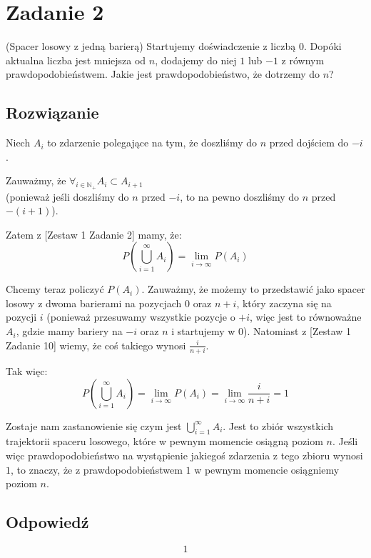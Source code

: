 \section{Zadanie 2}
(Spacer losowy z jedną barierą)
Startujemy doświadczenie z liczbą \(0\). Dopóki aktualna liczba jest mniejsza od \(n\),
dodajemy do niej \(1\) lub \(-1\) z równym prawdopodobieństwem.
Jakie jest prawdopodobieństwo, że dotrzemy do \(n\)?

\subsection*{Rozwiązanie}
Niech \(A_i\) to zdarzenie polegające na tym,
że doszliśmy do \(n\) przed dojściem do \(-i\).

Zauważmy, że \(\forall _{i\in\mathbb{N_+}} A_i \subset A_{i+1}\) \\
(ponieważ jeśli doszliśmy do \(n\) przed \(-i\), to na pewno doszliśmy do \(n\) przed \(-(i+1)\)).

Zatem z [Zestaw 1 Zadanie 2] mamy, że:
\[
	P\left(\bigcup_{i=1}^{\infty} A_i\right) = \lim_{i\to\infty} P(A_i)
\]

Chcemy teraz policzyć \(P(A_i)\).
Zauważmy, że możemy to przedstawić jako spacer losowy z dwoma barierami na pozycjach
\(0\) oraz \(n + i\), który zaczyna się na pozycji \(i\)
(ponieważ przesuwamy wszystkie pozycje o \(+i\), więc jest to równoważne \(A_i\),
gdzie mamy bariery na \(-i\) oraz \(n\) i startujemy w \(0\)).
Natomiast z [Zestaw 1 Zadanie 10] wiemy, że coś takiego wynosi \(\frac{i}{n+i}\).

Tak więc:
\[
	P\left(\bigcup_{i=1}^{\infty} A_i\right) = \lim_{i\to\infty} P(A_i) = \lim_{i\to\infty} \frac{i}{n+i} = 1
\]

Zostaje nam zastanowienie się czym jest \(\bigcup_{i=1}^{\infty} A_i\).
Jest to zbiór wszystkich trajektorii spaceru losowego, które w pewnym momencie osiągną poziom \(n\).
Jeśli więc prawdopodobieństwo na wystąpienie jakiegoś zdarzenia z tego zbioru wynosi \(1\),
to znaczy, że z prawdopodobieństwem \(1\) w pewnym momencie osiągniemy poziom \(n\).
\subsection*{Odpowiedź}
\[
	\boxed{\text{1}}
\]
